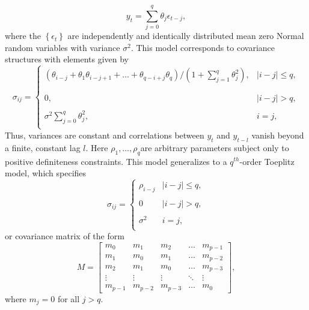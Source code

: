 \documentclass[../chapter-1-introduction.tex]{subfiles}
\begin{document}
\begin{equation}\label{eq:ma-q-model}
y_{t} = \sum_{j = 0}^{q} \theta_j \epsilon_{t-j},
\end{equation}
\bigskip
\noindent
where the $\left\{\epsilon_t\right\}$ are independently and identically distributed mean zero Normal random variables with variance $\sigma^2$. This model corresponds to covariance structures with elements given by
\begin{equation*}
\sigma_{ij} = \left\{ \begin{array}{ll}
\left(\theta_{i-j} + \theta_{1}\theta_{i-j +1} + \dots + \theta_{q-i+j}\theta_{q}\right)/\left(1 + \sum_{j = 1}^q \theta_j^2\right), & \vert i-j\vert \le q,\\ 
& \\
& \\
0, &  \vert i-j\vert > q, \\
& \\
\sigma^2 \sum\limits_{j = 0}^q \theta_j^2, & i = j,\\
\end{array}\right.
\end{equation*}
\bigskip
\noindent
Thus, variances are constant and correlations between $y_t$ and $y_{t-l}$ vanish beyond a finite, constant lag $l$. Here $\rho_1,\dots, \rho_q$are arbitrary parameters subject only to positive definiteness constraints. This model generalizes to a $q^{th}$-order Toeplitz model, which specifies
\begin{equation} \label{eq:toeplitz-covariance-model}
\sigma_{ij} = \left\{ \begin{array}{ll}
\rho_{i-j} & \vert i - j \vert\le q, \\ 
&\\
0 & \vert i - j \vert >  q, \\ 
& \\
\sigma^2  & i = j,\\
\end{array}\right.
\end{equation}
or covariance matrix of the form
\begin{equation} \label{eq:toeplitz-covariance-matrix}
M = \begin{bmatrix} m_0 & m_1 & m_2 & \dots & m_{p-1}\\ m_1 & m_0 & m_1 & \dots & m_{p-2}\\m_2 & m_1 & m_0 & \dots & m_{p-3}\\ \vdots & \vdots & \vdots & \ddots & \vdots\\  m_{p-1} & m_{p-2} & m_{p-3} & \dots & m_0 \end{bmatrix}, 
\end{equation}
\noindent
where $m_j = 0$ for all $j > q$.
\end{document}
